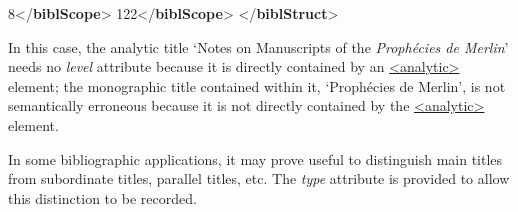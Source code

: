 \begin{shaded}
\hspace*{1em}\mbox{}\newline 
\hspace*{1em}8{</\textbf{biblScope}>}\mbox{}\newline 
\hspace*{1em}122{</\textbf{biblScope}>}\mbox{}\newline 
{}\mbox{}\newline 
{</\textbf{biblStruct}>}\end{shaded}\egroup\par \noindent  In this case, the analytic title ‘Notes on Manuscripts of the \textit{Prophécies de Merlin}’ needs no {\itshape level} attribute because it is directly contained by an \hyperref[TEI.analytic]{<analytic>} element; the monographic title contained within it, ‘Prophécies de Merlin’, is not semantically erroneous because it is not directly contained by the \hyperref[TEI.analytic]{<analytic>} element.\par
In some bibliographic applications, it may prove useful to distinguish main titles from subordinate titles, parallel titles, etc. The {\itshape type} attribute is provided to allow this distinction to be recorded.\par
